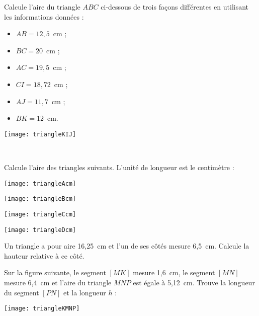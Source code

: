 \begin{exercice}
Calcule l'aire du triangle $ABC$ ci-dessous de trois façons différentes en utilisant les informations données :

\begin{minipage}[c]{0.38\linewidth}
\begin{itemize}
 \item $AB = 12,5$ cm ;
 \item $BC = 20$ cm ;
 \item $AC = 19,5$ cm ;
 \item $CI = 18,72$ cm ;
 \item $AJ = 11,7$ cm ;
 \item $BK = 12$ cm.
 \end{itemize}
 \end{minipage} \hfill%
 \begin{minipage}[c]{0.58\linewidth}
\begin{center} \texttt{[image: triangleKIJ]} \end{center} 
  \end{minipage} \\
\end{exercice}


\begin{exercice}
Calcule l'aire des triangles suivants. L'unité de longueur est le centimètre :
\begin{colenumerate}{2}
 \item 
 
 \texttt{[image: triangleAcm]}
  \item 
 
 \texttt{[image: triangleBcm]}
  \item 
 
 \texttt{[image: triangleCcm]}
  \item 
 
 \texttt{[image: triangleDcm]}
 \end{colenumerate}
\end{exercice}


\begin{exercice}
Un triangle a pour aire 16,25 cm et l'un de ses côtés mesure 6,5 cm. Calcule la hauteur relative à ce côté.
\end{exercice}


\begin{exercice}
Sur la figure suivante, le segment $[MK]$ mesure 1,6 cm, le segment $[MN]$ mesure 6,4 cm et l'aire du triangle $MNP$ est égale à 5,12 cm. Trouve la longueur du segment $[PN]$ et la longueur $h$ :
\begin{center} \texttt{[image: triangleKMNP]} \end{center} 
\end{exercice}



